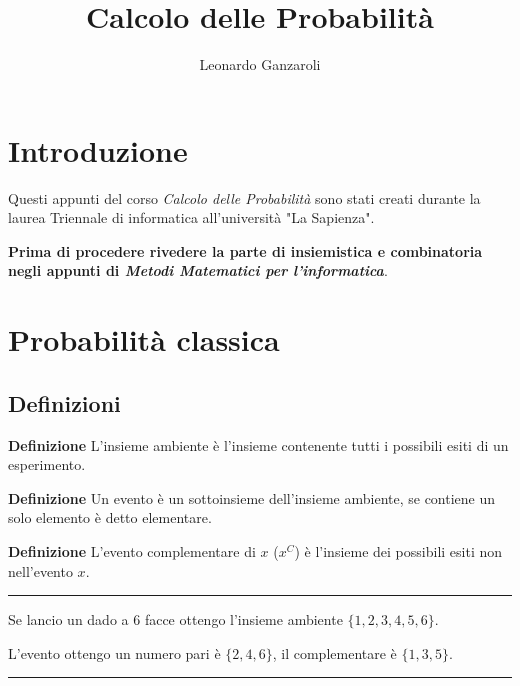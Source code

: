 \documentclass{article}
\title{Calcolo delle Probabilità}
\author{Leonardo Ganzaroli}
\date{}
\begin{document}
\maketitle


\tableofcontents

\newpage

\hypersetup{allcolors=black}

\section*{Introduzione}

Questi appunti del corso \textit{Calcolo delle Probabilità} sono stati creati durante la laurea Triennale di informatica all'università "La Sapienza".\newline

\noindent\textbf{Prima di procedere rivedere la parte di insiemistica e combinatoria negli appunti di \textit{Metodi Matematici per l'informatica}}.

\newpage

\section{Probabilità classica}

\subsection{Definizioni}

\textbf{Definizione} L'insieme ambiente è l'insieme contenente tutti i possibili esiti di un esperimento.\newline

\noindent\textbf{Definizione} Un evento è un sottoinsieme dell'insieme ambiente, se contiene un solo elemento è detto elementare.\newline

\noindent\textbf{Definizione} L'evento complementare di $x$ ($x^C$) è l'insieme dei possibili esiti non nell'evento $x$.\newline

\noindent\rule{\textwidth}{0.5pt}
Se lancio un dado a 6 facce ottengo l'insieme ambiente $\{1,2,3,4,5,6\}$.

\noindent L'evento ottengo un numero pari è $\{2,4,6\}$, il complementare è $\{1,3,5\}$.

\noindent\rule{\textwidth}{0.5pt}\newline
\end{document}
